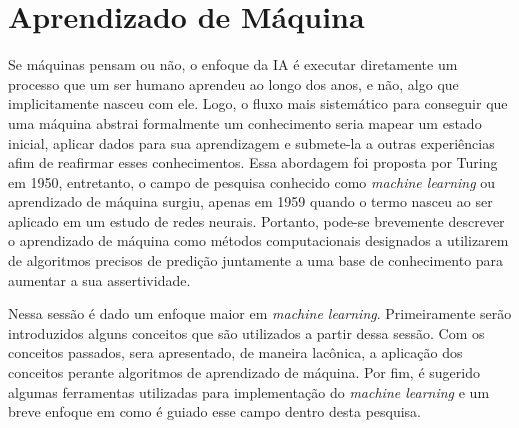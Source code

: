 \section{Aprendizado de Máquina}
Se máquinas pensam ou não, o enfoque da IA é executar diretamente um processo que um ser humano aprendeu ao longo dos anos, e não, algo que implicitamente nasceu com ele. Logo, o fluxo mais sistemático para conseguir que uma máquina abstrai formalmente um conhecimento seria mapear um estado inicial, aplicar dados para sua aprendizagem e submete-la a outras experiências afim de reafirmar esses conhecimentos. Essa abordagem foi proposta por Turing em 1950, entretanto, o campo de pesquisa conhecido como \textit{machine learning} ou aprendizado de máquina surgiu, apenas em 1959 quando o termo nasceu ao ser aplicado em um estudo de redes neurais. Portanto, pode-se brevemente descrever o aprendizado de máquina como métodos computacionais designados a utilizarem de algoritmos precisos de predição juntamente a uma base de conhecimento para aumentar a sua assertividade\cite[1]{turing1950, samuel1959some, mohri2012foundations}.

Nessa sessão é dado um enfoque maior em \textit{machine learning}. Primeiramente serão introduzidos alguns conceitos que são utilizados a partir dessa sessão. Com os conceitos passados, sera apresentado, de maneira lacônica, a aplicação dos conceitos perante algoritmos de aprendizado de máquina. Por fim, é sugerido algumas ferramentas utilizadas para implementação do \textit{machine learning} e um breve enfoque em como é guiado esse campo dentro desta pesquisa.



